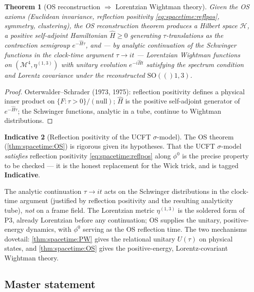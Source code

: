 \documentclass[11pt]{article}
\theoremstyle{plain}
\newtheorem{theorem}{Theorem}[section]
\theoremstyle{definition}
\newtheorem{indicative}[theorem]{Indicative}
\theoremstyle{remark}
\newcommand{\SO}[1]{\mathrm{SO}(#1)}
\begin{document}
\begin{theorem}[OS reconstruction $\Rightarrow$ Lorentzian Wightman theory]
\label{thm:spacetime:OS}
Given the OS axioms (Euclidean invariance, reflection positivity
\eqref{eq:spacetime:reflpos}, symmetry, clustering), the OS reconstruction theorem
produces a Hilbert space $\mathcal H$, a positive self-adjoint Hamiltonian
$\widehat H\ge0$ generating $\tau$-translations as the contraction semigroup
$e^{-\widehat H\tau}$, and --- by analytic continuation of the Schwinger functions in
the clock-time argument $\tau\to it$ --- Lorentzian Wightman functions on
$(\mathcal M^4,\eta^{(1,3)})$ with unitary evolution $e^{-i\widehat H t}$ satisfying the
spectrum condition and Lorentz covariance under the reconstructed $\SO(1,3)$.
\end{theorem}
\begin{proof}
Osterwalder--Schrader (1973, 1975): reflection positivity defines a physical inner
product on $\{F:\tau>0\}/(\text{null})$; $\widehat H$ is the positive self-adjoint
generator of $e^{-\widehat H\tau}$; the Schwinger functions, analytic in a tube,
continue to Wightman distributions.
\end{proof}

\begin{indicative}[Reflection positivity of the UCFT $\sigma$-model]
\label{ind:spacetime:reflpos}
The OS theorem (\autoref{thm:spacetime:OS}) is rigorous given its hypotheses. That the
UCFT $\sigma$-model \emph{satisfies} reflection positivity \eqref{eq:spacetime:reflpos}
along $\phi^0$ is the precise property to be checked --- it is the honest replacement
for the Wick trick, and is tagged \textbf{Indicative}.
\end{indicative}

The analytic continuation $\tau\to it$ acts on the Schwinger distributions in the
clock-time argument (justified by reflection positivity and the resulting analyticity
tube), \emph{not} on a frame field. The Lorentzian metric $\eta^{(1,3)}$ is the
soldered form of P3, already Lorentzian before any continuation; OS supplies the
unitary, positive-energy dynamics, with $\phi^0$ serving as the OS reflection time. The
two mechanisms dovetail: \autoref{thm:spacetime:PW} gives the relational unitary
$U(\tau)$ on physical states, and \autoref{thm:spacetime:OS} gives the positive-energy,
Lorentz-covariant Wightman theory.

\subsection{Master statement}
\label{sec:spacetime:master}
\end{document}
